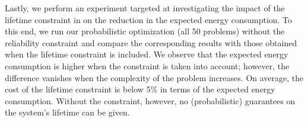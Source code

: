 Lastly, we perform an experiment targeted at investigating the impact of the
lifetime constraint in  on the reduction in
the expected energy consumption. To this end, we run our probabilistic
optimization (all 50 problems) without the reliability constraint and compare
the corresponding results with those obtained when the lifetime constraint is
included. We observe that the expected energy consumption is higher when the
constraint is taken into account; however, the difference vanishes when the
complexity of the problem increases. On average, the cost of the lifetime
constraint is below 5\% in terms of the expected energy consumption. Without the
constraint, however, no (probabilistic) guarantees on the system's lifetime can
be given.
